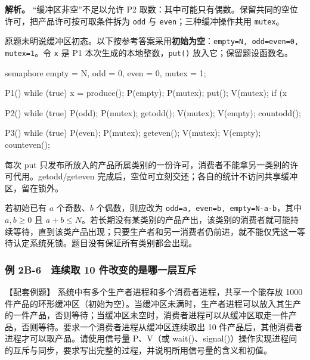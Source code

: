 \textbf{解析。} ``缓冲区非空''不足以允许 P2 取数：其中可能只有偶数。保留共同的空位许可，把产品许可按可取条件拆为 \texttt{odd} 与 \texttt{even}；三种缓冲操作共用 \texttt{mutex}。

原题未明说缓冲区初态。以下按参考答案采用\textbf{初始为空}：\texttt{empty=\allowbreak{}N,\allowbreak{} odd=\allowbreak{}even=\allowbreak{}0,\allowbreak{} mutex=\allowbreak{}1}。令 \texttt{x} 是 P1 本次生成的本地整数，\texttt{put(\allowbreak{})\allowbreak{}} 放入它；保留题设函数名。

\begin{codeblock}[language={}]
semaphore empty = N, odd = 0, even = 0, mutex = 1;

P1() {
    while (true) {
        x = produce();
        P(empty);
        P(mutex);
        put();
        V(mutex);
        if (x %
    }
}
\end{codeblock}

\begin{codeblock}[language={}]
P2() {
    while (true) {
        P(odd);
        P(mutex);
        getodd();
        V(mutex);
        V(empty);
        countodd();
    }
}
\end{codeblock}

\begin{codeblock}[language={}]
P3() {
    while (true) {
        P(even);
        P(mutex);
        geteven();
        V(mutex);
        V(empty);
        counteven();
    }
}
\end{codeblock}

每次 put 只发布所放入的产品所属类别的一份许可，消费者不能拿另一类别的许可代用。getodd/geteven 完成后，空位可立刻交还；各自的统计不访问共享缓冲区，留在锁外。

若初始已有 \(a\) 个奇数、\(b\) 个偶数，则应改为 \texttt{odd=\allowbreak{}a,\allowbreak{} even=\allowbreak{}b,\allowbreak{} empty=\allowbreak{}N-a-b}，其中 \(a,b\ge0\) 且 \(a+b\le N\)。若长期没有某类别的产品产出，该类别的消费者就可能持续等待，直到该类产品出现；只要生产者和另一消费者仍前进，就不能仅凭这一等待认定系统死锁。题目没有保证所有类别都会出现。

\subsubsection{例 2B-6　连续取 10 件改变的是哪一层互斥}\label{OS02-ex-2014}

\begin{example}[配套例题]

【配套例题】 系统中有多个生产者进程和多个消费者进程，共享一个能存放 1000 件产品的环形缓冲区（初始为空）。当缓冲区未满时，生产者进程可以放入其生产的一件产品，否则等待；当缓冲区未空时，消费者进程可以从缓冲区取走一件产品，否则等待。要求一个消费者进程从缓冲区连续取出 10 件产品后，其他消费者进程才可以取产品。请使用信号量 P、V（或 wait()、signal()）操作实现进程间的互斥与同步，要求写出完整的过程，并说明所用信号量的含义和初值。

\end{example}

